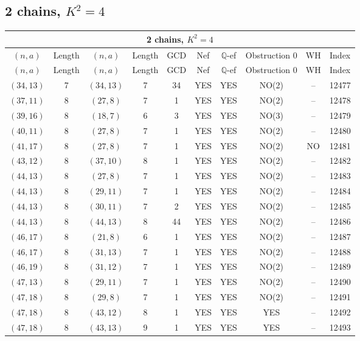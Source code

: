 \subsection{2 chains, $K^2 = 4$}
\begin{longtable}{|c|c|c|c|c|c|c|c|c|c|}
\hline
\multicolumn{10}{|c|}{2 chains, $K^2 = 4$}\\
\hline
$(n,a)$ & Length & $(n,a)$ & Length & GCD & Nef & $\mathbb Q$-ef & Obstruction 0 & WH & Index\\
\hline
\endfirsthead

\hline
$(n,a)$ & Length & $(n,a)$ & Length & GCD & Nef & $\mathbb Q$-ef & Obstruction 0 & WH & Index\\
\hline
\endhead
\hline
\endfoot

$(34, 13)$ & 7 & $(34, 13)$ & 7 & 34 & YES & YES & NO(2) & -- & 12477\\
$(37, 11)$ & 8 & $(27, 8)$ & 7 & 1 & YES & YES & NO(2) & -- & 12478\\
$(39, 16)$ & 8 & $(18, 7)$ & 6 & 3 & YES & YES & NO(3) & -- & 12479\\
$(40, 11)$ & 8 & $(27, 8)$ & 7 & 1 & YES & YES & NO(2) & -- & 12480\\
$(41, 17)$ & 8 & $(27, 8)$ & 7 & 1 & YES & YES & NO(2) & NO & 12481\\
$(43, 12)$ & 8 & $(37, 10)$ & 8 & 1 & YES & YES & NO(2) & -- & 12482\\
$(44, 13)$ & 8 & $(27, 8)$ & 7 & 1 & YES & YES & NO(2) & -- & 12483\\
$(44, 13)$ & 8 & $(29, 11)$ & 7 & 1 & YES & YES & NO(2) & -- & 12484\\
$(44, 13)$ & 8 & $(30, 11)$ & 7 & 2 & YES & YES & NO(2) & -- & 12485\\
$(44, 13)$ & 8 & $(44, 13)$ & 8 & 44 & YES & YES & NO(2) & -- & 12486\\
$(46, 17)$ & 8 & $(21, 8)$ & 6 & 1 & YES & YES & NO(2) & -- & 12487\\
$(46, 17)$ & 8 & $(31, 13)$ & 7 & 1 & YES & YES & NO(2) & -- & 12488\\
$(46, 19)$ & 8 & $(31, 12)$ & 7 & 1 & YES & YES & NO(2) & -- & 12489\\
$(47, 13)$ & 8 & $(29, 11)$ & 7 & 1 & YES & YES & NO(2) & -- & 12490\\
$(47, 18)$ & 8 & $(29, 8)$ & 7 & 1 & YES & YES & NO(2) & -- & 12491\\
$(47, 18)$ & 8 & $(43, 12)$ & 8 & 1 & YES & YES & YES & -- & 12492\\
$(47, 18)$ & 8 & $(43, 13)$ & 9 & 1 & YES & YES & YES & -- & 12493\\

\end{longtable}
